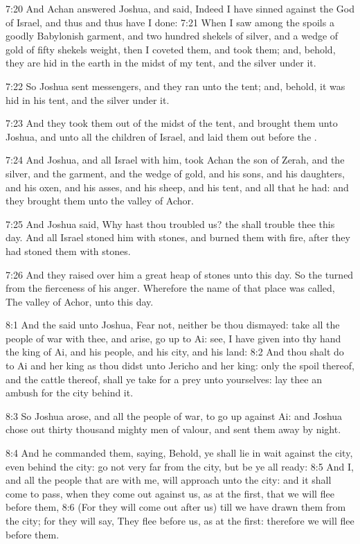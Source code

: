 7:20 And Achan answered Joshua, and said, Indeed I have sinned against the \LORD God of Israel, and thus and thus have I done: 7:21 When I saw among the spoils a goodly Babylonish garment, and two hundred shekels of silver, and a wedge of gold of fifty shekels weight, then I coveted them, and took them; and, behold, they are hid in the earth in the midst of my tent, and the silver under it.

7:22 So Joshua sent messengers, and they ran unto the tent; and, behold, it was hid in his tent, and the silver under it.

7:23 And they took them out of the midst of the tent, and brought them unto Joshua, and unto all the children of Israel, and laid them out before the \LORD.

7:24 And Joshua, and all Israel with him, took Achan the son of Zerah, and the silver, and the garment, and the wedge of gold, and his sons, and his daughters, and his oxen, and his asses, and his sheep, and his tent, and all that he had: and they brought them unto the valley of Achor.

7:25 And Joshua said, Why hast thou troubled us? the \LORD shall trouble thee this day. And all Israel stoned him with stones, and burned them with fire, after they had stoned them with stones.

7:26 And they raised over him a great heap of stones unto this day. So the \LORD turned from the fierceness of his anger. Wherefore the name of that place was called, The valley of Achor, unto this day.

8:1 And the \LORD said unto Joshua, Fear not, neither be thou dismayed: take all the people of war with thee, and arise, go up to Ai: see, I have given into thy hand the king of Ai, and his people, and his city, and his land: 8:2 And thou shalt do to Ai and her king as thou didst unto Jericho and her king: only the spoil thereof, and the cattle thereof, shall ye take for a prey unto yourselves: lay thee an ambush for the city behind it.

8:3 So Joshua arose, and all the people of war, to go up against Ai: and Joshua chose out thirty thousand mighty men of valour, and sent them away by night.

8:4 And he commanded them, saying, Behold, ye shall lie in wait against the city, even behind the city: go not very far from the city, but be ye all ready: 8:5 And I, and all the people that are with me, will approach unto the city: and it shall come to pass, when they come out against us, as at the first, that we will flee before them, 8:6 (For they will come out after us) till we have drawn them from the city; for they will say, They flee before us, as at the first: therefore we will flee before them.

